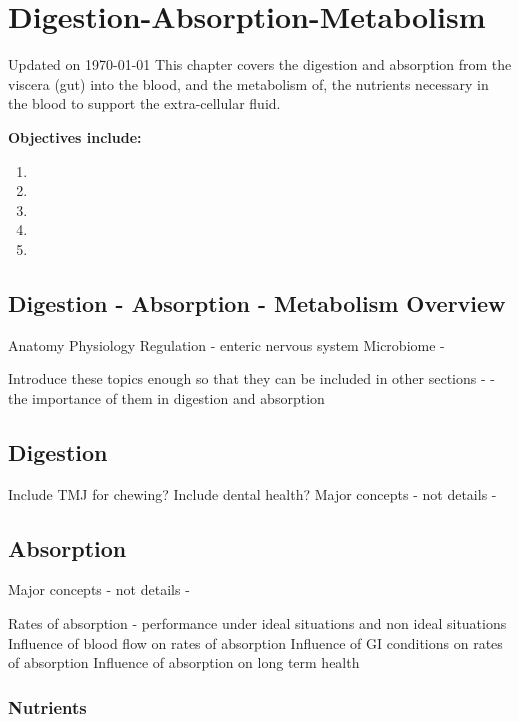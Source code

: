 \chapter{Digestion-Absorption-Metabolism}\label{chp:digestion_absorption_metabolism}
Updated on \today
\minitoc
This chapter covers the digestion and absorption from the viscera (gut) into the blood, and the metabolism of, the nutrients necessary in the blood to support the extra-cellular fluid. 



\vspace{5mm}

\textbf{Objectives include:}
\begin{enumerate}
    \item
    \item
    \item
    \item
    \item
\end{enumerate}

\section{Digestion - Absorption - Metabolism Overview}
Anatomy
Physiology
Regulation - enteric nervous system
Microbiome - 

Introduce these topics enough so that they can be included in other sections - - the importance of them in digestion and absorption


\section{Digestion}

Include TMJ for chewing?
Include dental health?
Major concepts - not details - 

\section{Absorption}

Major concepts - not details - 

Rates of absorption - performance under ideal situations and non ideal situations
Influence of blood flow on rates of absorption
Influence of GI conditions on rates of absorption
Influence of absorption on long term health

\subsection{Nutrients}

